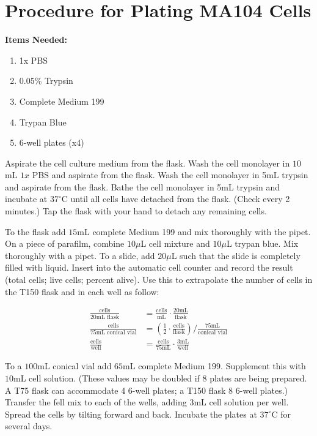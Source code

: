 \section{Procedure for Plating MA104 Cells}

{\bfseries Items Needed:} \begin{enumerate}
	\item 1x PBS
	\item 0.05\% Trypsin
	\item Complete Medium 199
	\item Trypan Blue
	\item 6-well plates (x4)
\end{enumerate}

Aspirate the cell culture medium from the flask. Wash the cell monolayer in $10$mL $1x$ PBS and aspirate from the flask. Wash the cell monolayer in 5mL trypsin and aspirate from the flask. Bathe the cell monolayer in 5mL trypsin and incubate at $37^{\circ}$C until all cells have detached from the flask. (Check every 2 minutes.) Tap the flask with your hand to detach any remaining cells.

To the flask add $15$mL complete Medium 199 and mix thoroughly with the pipet. On a piece of parafilm, combine $10\mu$L cell mixture and $10\mu$L trypan blue. Mix thoroughly with a pipet. To a slide, add $20\mu$L such that the slide is completely filled with liquid. Insert into the automatic cell counter and record the result (total cells; live cells; percent alive). Use this to extrapolate the number of cells in the T150 flask and in each well as follow:

\begin{align*}
\frac{\text{cells}}{20\text{mL flask}} &= \frac{\text{cells}}{\text{mL}}\cdot \frac{20\text{mL}}{\text{flask}}\\
\frac{\text{cells}}{75\text{mL conical vial}} &= \left(\frac{1}{2}\cdot\frac{\text{cells}}{\text{flask}}\right)/\frac{75\text{mL}}{\text{conical vial}}\\
\frac{\text{cells}}{\text{well}} &= \frac{\text{cells}}{75\text{mL}}\cdot\frac{3\text{mL}}{\text{well}}
\end{align*}

To a $100$mL conical vial add $65$mL complete Medium 199. Supplement this with $10$mL cell solution. (These values may be doubled if 8 plates are being prepared. A T75 flask can accommodate 4 6-well plates; a T150 flask 8 6-well plates.) Transfer the fell mix to each of the wells, adding $3$mL cell solution per well. Spread the cells by tilting forward and back. Incubate the plates at $37^{\circ}$C for several days.

